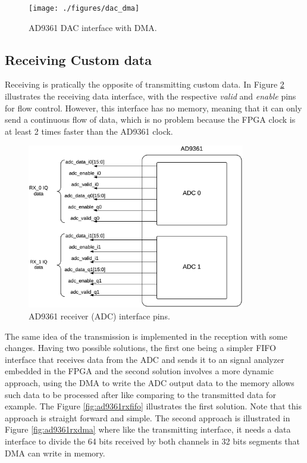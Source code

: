 
\begin{figure}[htbp]
    \centering
    \texttt{[image: ./figures/dac\_dma]}
    \caption{ AD9361 DAC interface with DMA.
    \label{fig:ad9361txdma}}
\end{figure}

\subsection{Receiving Custom data}

Receiving is pratically the opposite of transmitting custom data. In Figure
\ref{fig:rxpins} illustrates the receiving data interface, with the respective
\emph{valid} and \emph{enable} pins for flow control. However, this interface
has no memory, meaning that it can only send a continuous flow of data, which is
no problem because the FPGA clock is at least 2 times faster than the AD9361
clock.

\begin{figure}[htbp]
    \centering
    \includegraphics[width=0.85\textwidth]{./figures/ad9361rx_pins}
    \caption{ AD9361 receiver (ADC) interface pins.
    \label{fig:rxpins}}
\end{figure}

The same idea of the transmission is implemented in the reception with some
changes. Having two possible solutions, the first one being a simpler FIFO
interface that receives data from the ADC and sends it to an signal analyzer
embedded in the FPGA and the second solution involves a more dynamic approach,
using the DMA to write the ADC output data to the memory allows such data to be
processed after like comparing to the transmitted data for example. The Figure
\ref{fig:ad9361rxfifo} illustrates the first solution. Note that this approach
is straight forward and simple. The second approach is illustrated in Figure
\ref{fig:ad9361rxdma} where like the transmitting interface, it needs a data
interface to divide the 64 bits received by both channels in 32 bits segments
that DMA can write in memory.


